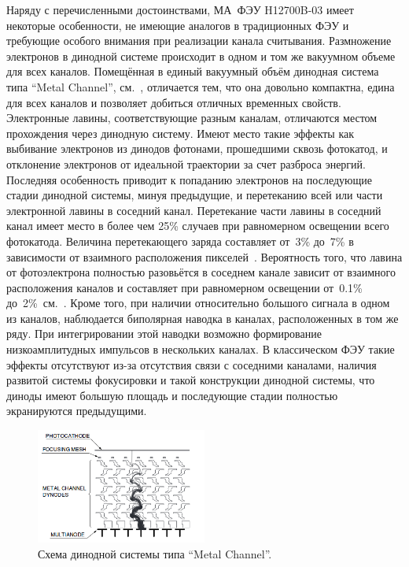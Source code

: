 Наряду с перечисленными достоинствами, МА~ФЭУ H12700B-03 имеет некоторые особенности, не имеющие аналогов в традиционных ФЭУ и требующие особого внимания при реализации канала считывания. Размножение электронов в динодной системе происходит в одном и том же вакуумном объеме для всех каналов. Помещённая в единый вакуумный объём динодная система типа ``Metal Channel'', см.~, отличается тем, что она довольно компактна, едина для всех каналов и позволяет добиться отличных временных свойств. Электронные лавины, соответствующие разным каналам, отличаются местом прохождения через динодную систему. Имеют место такие эффекты как выбивание электронов из динодов фотонами, прошедшими сквозь фотокатод, и отклонение электронов от идеальной траектории за счет разброса энергий. Последняя особенность приводит к попаданию электронов на последующие стадии динодной системы, минуя предыдущие, и перетеканию всей или части электронной лавины в соседний канал. Перетекание части лавины в соседний канал имеет место в более чем 25\% случаев при равномерном освещении всего фотокатода. Величина перетекающего заряда составляет от~3\% до~7\% в зависимости от взаимного расположения пикселей~\cite{CALVI}. Вероятность того, что лавина от фотоэлектрона полностью разовьётся в соседнем канале зависит от взаимного расположения каналов и составляет при равномерном освещении от~0.1\% до~2\%~см.~\cite{KOPFERDISS}. Кроме того, при наличии относительно большого сигнала в одном из каналов, наблюдается биполярная наводка в каналах, расположенных в том же ряду. При интегрировании этой наводки возможно формирование низкоамплитудных импульсов в нескольких каналах. В классическом ФЭУ такие эффекты отсутствуют из-за отсутствия связи с соседними каналами, наличия развитой системы фокусировки и такой конструкции динодной системы, что диноды имеют большую площадь и последующие стадии полностью экранируются предыдущими.

\begin{figure}
\includegraphics[width=0.5\textwidth]{pictures/2_Metal_channel.png}
\caption{Схема динодной системы типа ``Metal Channel''.}
\label{fig:MetalChannel}
\end{figure}

